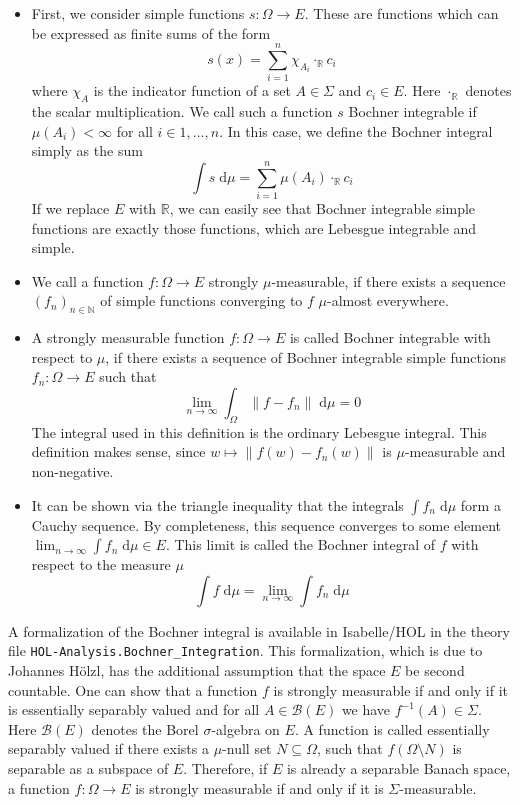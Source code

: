 \begin{itemize}
\item[] First, we consider simple functions $s : \Omega \rightarrow E$. These are functions which can be expressed as finite sums of the form
\[
s(x) = \sum_{i=1}^n \chi_{A_i} \cdot_\mathbb{R} c_i\]
where $\chi_A$ is the indicator function of a set $A \in \Sigma$ and $c_i \in E$. Here $\cdot_\mathbb{R}$ denotes the scalar multiplication. We call such a function $s$ Bochner integrable if $\mu(A_i) < \infty$ for all $i \in {1,\dots,n}$. In this case, we define the Bochner integral simply as the sum
\[
	\int s \; \textrm{d}\mu = \sum_{i=1}^n \mu(A_i) \cdot_\mathbb{R} c_i
\]
If we replace $E$ with $\mathbb{R}$, we can easily see that Bochner integrable simple functions are exactly those functions, which are Lebesgue integrable and simple.
\item[] We call a function $f : \Omega \rightarrow E$ strongly $\mu$-measurable, if there exists a sequence $(f_n)_{n\in\mathbb{N}}$ of simple functions converging to $f$ $\mu$-almost everywhere.
\item[] A strongly measurable function $f : \Omega \rightarrow E$ is called Bochner integrable with respect to $\mu$, if there exists a sequence of Bochner integrable simple functions $f_n : \Omega \rightarrow E$ such that
\[
	\lim_{n \to \infty} \int_\Omega \lVert f - f_n \rVert \; \textrm{d}\mu = 0
\]
The integral used in this definition is the ordinary Lebesgue integral. This definition makes sense, since $w \mapsto \lVert f(w) - f_n(w) \rVert$ is $\mu$-measurable and non-negative.
\item[] It can be shown via the triangle inequality that the integrals $\int f_n\; \textrm{d}\mu$ form a Cauchy sequence. By completeness, this sequence converges to some element $\lim_{n \to \infty} \int f_n \; \textrm{d}\mu \in E$. This limit is called the Bochner integral of $f$ with respect to the measure $\mu$
\[
	\int f \; \textrm{d}\mu = \lim_{n \to \infty} \int f_n \; \textrm{d}\mu
\]
\end{itemize}

A formalization of the Bochner integral is available in Isabelle/HOL in the theory file \texttt{HOL-Analysis.Bochner\_Integration}. This formalization, which is due to Johannes Hölzl, has the additional assumption that the space $E$ be second countable. One can show that a function $f$ is strongly measurable if and only if it is essentially separably valued and for all $A \in \mathcal{B}(E)$ we have $f^{-1}(A) \in \Sigma$. Here $\mathcal{B}(E)$ denotes the Borel $\sigma$-algebra on $E$. A function is called essentially separably valued if there exists a $\mu$-null set $N \subseteq \Omega$, such that $f (\Omega \setminus N)$ is separable as a subspace of $E$. Therefore, if $E$ is already a separable Banach space, a function $f : \Omega \rightarrow E$ is strongly measurable if and only if it is $\Sigma$-measurable.

